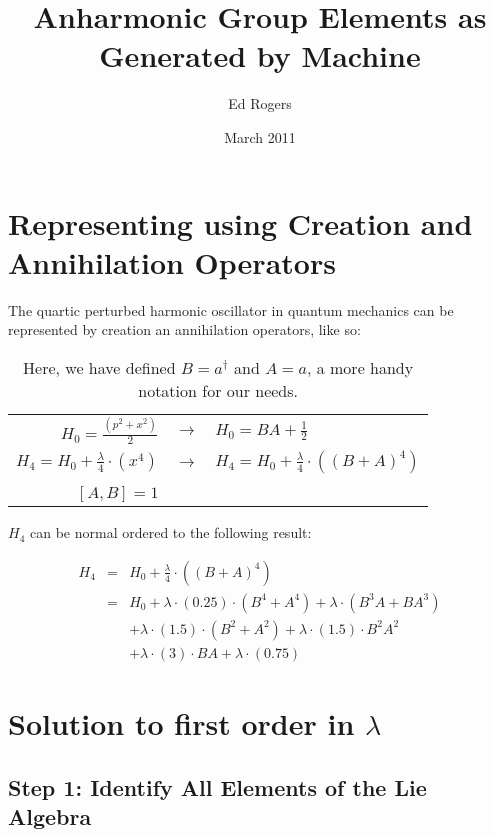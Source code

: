 \documentclass{article}
\title{Anharmonic Group Elements as Generated by Machine}
\author{Ed Rogers}
\date{March 2011}
\begin{document}
   \maketitle

\section{Representing using Creation and Annihilation Operators}
\label{secRepresentationIntro}

The quartic perturbed harmonic oscillator in quantum mechanics can be represented by creation an annihilation operators, like so:

\begin{table}[!hp]
\begin{center}
\begin{tabular}{rcl}
$H_{0} = \frac{(p^2+x^2)}{2}$ & $\rightarrow$ & $H_{0} = BA+\frac{1}{2}$ \\
$H_{4} = H_{0} + \frac{\lambda}{4}{\cdot}(x^{4})$ & $\rightarrow$ & $H_{4} = H_{0} + \frac{\lambda}{4}{\cdot}((B+A)^{4})$ \\
& & \\
$[A,B] = 1$ & & \\
\end{tabular}
\caption{Here, we have defined $B=a^{\dagger}$ and $A=a$, a more handy notation for our needs.\label{tabBuildingBlocks}}
\end{center}
\end{table}

$H_{4}$ can be normal ordered to the following result:

\begin{eqnarray}
H_{4} & = & H_{0} + \frac{\lambda}{4}{\cdot}((B+A)^{4}) \\
      & = & H_{0} + {\lambda}{\cdot}(0.25){\cdot}(B^{4}+A^{4}) + {\lambda}{\cdot}(B^{3}A+BA^{3}) \nonumber \\
      &   &  + {\lambda}{\cdot}(1.5){\cdot}(B^{2}+A^{2}) + {\lambda}{\cdot}(1.5){\cdot}B^{2}A^{2} \nonumber \\
      &   &  + {\lambda}{\cdot}(3){\cdot}BA + {\lambda}{\cdot}(0.75)
\end{eqnarray}

\clearpage
\newpage
\section{Solution to first order in $\lambda$}
\label{secFirstOrder}

\subsection{Step 1: Identify All Elements of the Lie Algebra}
\end{document}
